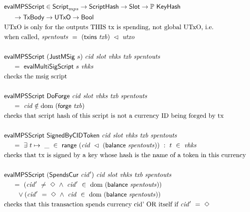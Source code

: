 \begin{figure*}[htb]
  \begin{align*}
    & \fun{evalMPSScript} \in\ScriptMPS\to\ScriptHash\to\Slot\to\powerset\KeyHash \\
    &~~~~\to\TxBody\to\UTxO \to\Bool  \\
    & \text{UTxO is only for the outputs THIS tx is spending, not global UTxO, i.e.} \\
    & \text{when called,}~\var{spentouts}~=~(\fun{txins}~\var{txb}) ~\restrictdom~\var{utxo} \\~\\
    & \fun{evalMPSScript}  ~(\type{JustMSig}~s)~\var{cid}~\var{slot}~\var{vhks}
     ~\var{txb}~\var{spentouts} \\
    &~~~~ =~ \fun{evalMultiSigScript}~s~\var{vhks} \\
    & \text {checks the msig script}\\~\\
    & \fun{evalMPSScript}
     ~\type{DoForge}~\var{cid}~ \var{slot}~\var{vhks} ~\var{txb}~\var{spentouts} \\
    &~~~~ =~ \var{cid} \notin \dom~(\fun{forge}~\var{txb}) \\
    & \text {checks that script hash of this script is not a currency ID being forged by tx}  \\~\\
    & \fun{evalMPSScript}
     ~\type{SignedByCIDToken}~\var{cid}~ \var{slot}~\var{vhks} ~\var{txb}~\var{spentouts} \\
    &~~~~ =~ \exists~t\mapsto ~\_~\in~ \fun{range}~(\var{cid}~ \restrictdom~(\fun{balance}~\var{spentouts})) ~:~ t~\in~\var{vhks} \\
    & \text{checks that tx is signed by a key whose hash is the name of a token in this currency}
    \\~\\
    & \fun{evalMPSScript}
     ~(\type{SpendsCur}~\var{cid'})~\var{cid}~ \var{slot}~\var{vhks} ~\var{txb}~\var{spentouts} \\
    &~~~~ =~ (\var{cid'}~\neq~\Nothing ~\wedge ~\var{cid'}~\in~ \dom~(\fun{balance}~\var{spentouts}))\\
    &~~~~~~ \vee (\var{cid'}~=~\Nothing ~\wedge ~\var{cid}~\in~ \dom~(\fun{balance}~\var{spentouts})) \\
    & \text{checks that this transaction spends currency cid' OR itself if}~\var{cid'}~=~\Nothing
    \\~\\

\end{align*}
\end{figure*}
